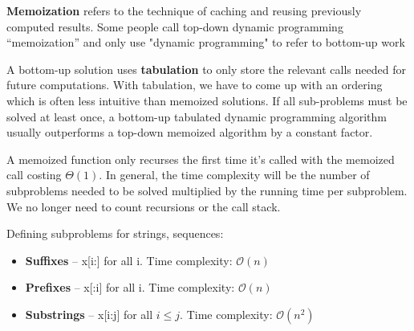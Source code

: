 \documentclass{article}
\newcommand{\bigO}{\mathcal{O}}
\begin{document}
    \textbf{Memoization} refers to the technique of caching and reusing previously computed results. Some people call top-down dynamic programming ``memoization'' and only use "dynamic programming" to refer to bottom-up work
    
    A bottom-up solution uses \textbf{tabulation} to only store the relevant calls needed for future computations. With tabulation, we have to come up with an ordering which is often less intuitive than memoized solutions. If all sub-problems must be solved at least once, a bottom-up tabulated dynamic programming algorithm usually outperforms a top-down memoized algorithm by a constant factor.

    A memoized function only recurses the first time it's called with the memoized call costing $\Theta(1)$. In general, the time complexity will be the number of subproblems needed to be solved multiplied by the running time per subproblem. We no longer need to count recursions or the call stack.
    
    
    
    Defining subproblems for strings, sequences:
    \begin{itemize}
        \item \textbf{Suffixes} -- x[i:] for all i. Time complexity: $\bigO(n)$
        \item \textbf{Prefixes} -- x[:i] for all i. Time complexity: $\bigO(n)$
        \item \textbf{Substrings} -- x[i:j] for all $i \leq j$. Time complexity: $\bigO(n^2)$
    \end{itemize}
    
\end{document}
